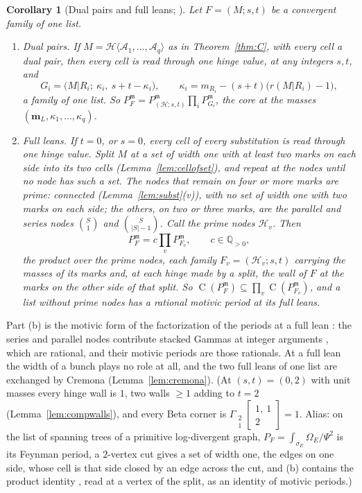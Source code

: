 \documentclass[11pt]{article}
\theoremstyle{plain}
\newtheorem{cor}[prop]{Corollary}
\theoremstyle{definition}
\theoremstyle{remark}
\newcommand{\Q}{\mathbb Q}
\newcommand{\m}{\mathfrak m}
\newcommand{\bm}{\mathbf m}
\newcommand{\Conj}{\operatorname{C}}
\newcommand{\Gst}[4]{\Gamma_{\substack{#1\\#2}}\!\begin{bmatrix}#3\\#4\end{bmatrix}}
\begin{document}
\begin{cor}[Dual pairs and full leans; {\cite[Thm.~20.9, p.~166; Cor.~21.7, p.~174; Cor.~22.8(ii), p.~186]{F}}]\label{cor:instances}
Let $F=(M;s,t)$ be a convergent family of one list.
\begin{enumerate}[label=(\alph*)]
\item \emph{Dual pairs.} If $M=\mathcal H\langle\mathcal A_1,\dots,\mathcal A_q\rangle$ as in Theorem~\ref{thm:C}, with every cell a dual pair, then every cell is read through one hinge value, at any integers $s,t$, and
\[
G_i=\big(M|R_i;\ \kappa_i,\ s+t-\kappa_i\big),\qquad \kappa_i=m_{R_i}-(s+t)\big(r(M|R_i)-1\big),
\]
a family of one list. So $P_F^{\m}=P_{(\mathcal H;s,t)}^{\m}\prod_iP_{G_i}^{\m}$, the core at the masses $(\bm_L,\kappa_1,\dots,\kappa_q)$.
\item \emph{Full leans.} If $t=0$, or $s=0$, every cell of every substitution is read through one hinge value. Split $M$ at a set of width one with at least two marks on each side into its two cells (Lemma~\ref{lem:cellofset}), and repeat at the nodes until no node has such a set. The nodes that remain on four or more marks are \emph{prime}: connected (Lemma~\ref{lem:subst}(v)), with no set of width one with two marks on each side; the others, on two or three marks, are the parallel and series nodes $\binom S1$ and $\binom S{|S|-1}$. Call the prime nodes $\mathcal H_v$. Then
\[
P_F^{\m}=c\prod_vP^{\m}_{F_v},\qquad c\in\Q_{>0},
\]
the product over the prime nodes, each family $F_v=(\mathcal H_v;s,t)$ carrying the masses of its marks and, at each hinge made by a split, the wall of $F$ at the marks on the other side of that split. So $\Conj(P_F^{\m})\subseteq\prod_v\Conj(P^{\m}_{F_v})$, and a list without prime nodes has a rational motivic period at its full leans.
\end{enumerate}
\end{cor}

Part (b) is the motivic form of the factorization of the periods at a full lean \cite[Thm.~25.6, p.~208]{F}: the series and parallel nodes contribute stacked Gammas at integer arguments \cite[Prop.~25.10, p.~209]{F}, which are rational, and their motivic periods are those rationals. At a full lean the width of a bunch plays no role at all, and the two full leans of one list are exchanged by Cremona (Lemma~\ref{lem:cremona}). (At $(s,t)=(0,2)$ with unit masses every hinge wall is $1$, two walls $\ge1$ adding to $t=2$ (Lemma~\ref{lem:compwalls}), and every Beta corner is $\Gst21{1,\ 1}{2}=1$. Alias: on the list of spanning trees of a primitive log-divergent graph, $P_F=\int_{\sigma_E}\Omega_E/\Psi^2$ is its Feynman period, a $2$-vertex cut gives a set of width one, the edges on one side, whose cell is that side closed by an edge across the cut, and (b) contains the product identity \cite[Thm.~2.10]{Sch}, read at a vertex of the split, as an identity of motivic periods.)
\end{document}
